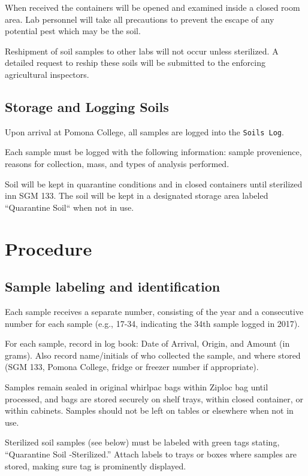 \documentclass[12pt]{../SOP3}\usepackage[]{graphicx}\usepackage[]{color}
\begin{document}
\NP When received the containers will be opened and examined inside a closed room area. Lab personnel will take all precautions to prevent the escape of any potential pest which may be the soil. 

\NP Reshipment of soil samples to other labs will not occur unless sterilized. A detailed request to reship these soils will be submitted to the enforcing agricultural inspectors. 

\subsection{Storage and Logging Soils}

\NP Upon arrival at Pomona College, all samples are logged into the \texttt{Soils Log}.

\NP Each sample must be logged with the following information: sample provenience, reasons for collection, mass, and types of analysis performed.

\NP Soil will be kept in quarantine conditions and in closed containers until sterilized inn SGM 133. The soil will be kept in a designated storage area labeled ``Quarantine Soil`` when not in use.

\section{Procedure}

\subsection{Sample labeling and identification}

\NP Each sample receives a separate number, consisting of the year and a consecutive number for each sample (e.g., 17-34, indicating the 34th sample logged in 2017).

\NP For each sample, record in log book: Date of Arrival, Origin, and Amount (in grams). Also record name/initials of who collected the sample, and where stored (SGM 133, Pomona College, fridge or freezer number if appropriate). 

\NP Samples remain sealed in original whirlpac bags within Ziploc bag until processed, and bags are stored securely on shelf trays, within closed container, or within cabinets. Samples should not be left on tables or elsewhere when not in use.

\NP Sterilized soil samples (see below) must be labeled with green tags stating, ``Quarantine Soil -Sterilized.'' Attach labels to trays or boxes where samples are stored, making sure tag is prominently displayed.
\end{document}
